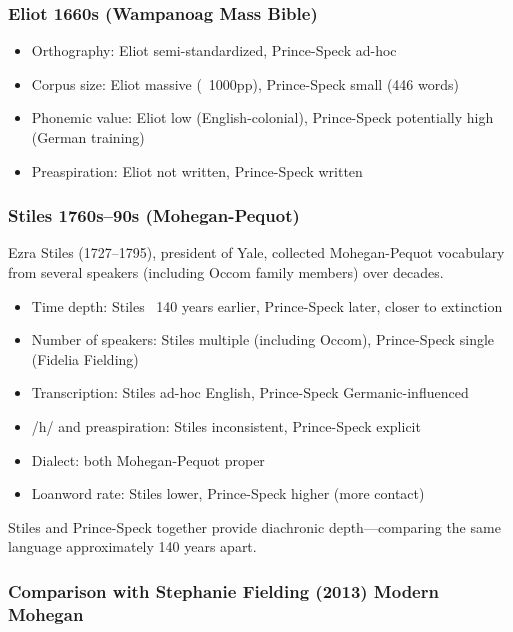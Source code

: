 \subsubsection{Eliot 1660s (Wampanoag Mass Bible)}

\begin{itemize}
  \item Orthography: Eliot semi-standardized, Prince-Speck ad-hoc
  \item Corpus size: Eliot massive (~1000pp), Prince-Speck small (446 words)
  \item Phonemic value: Eliot low (English-colonial), Prince-Speck
    potentially high (German training)
  \item Preaspiration: Eliot not written, Prince-Speck written
\end{itemize}

\subsubsection{Stiles 1760s--90s (Mohegan-Pequot)}

Ezra Stiles (1727--1795), president of Yale, collected Mohegan-Pequot
vocabulary from several speakers (including Occom family members) over
decades.

\begin{itemize}
  \item Time depth: Stiles ~140 years earlier, Prince-Speck later, closer to
    extinction
  \item Number of speakers: Stiles multiple (including Occom), Prince-Speck
    single (Fidelia Fielding)
  \item Transcription: Stiles ad-hoc English, Prince-Speck Germanic-influenced
  \item /h/ and preaspiration: Stiles inconsistent, Prince-Speck explicit
  \item Dialect: both Mohegan-Pequot proper
  \item Loanword rate: Stiles lower, Prince-Speck higher (more contact)
\end{itemize}

Stiles and Prince-Speck together provide diachronic depth---comparing the
same language approximately 140 years apart.

\subsubsection{Comparison with Stephanie Fielding (2013) Modern Mohegan}

